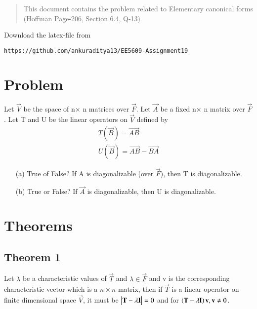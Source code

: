 \documentclass[journal,12pt,twocolumn]{IEEEtran}
\begin{document}
\begin{abstract}
This document contains the problem related to Elementary canonical forms (Hoffman Page-206, Section 6.4, Q-13) 
\end{abstract}
Download the latex-file from 
\begin{lstlisting}
https://github.com/ankuraditya13/EE5609-Assignment19
\end{lstlisting}

\section{Problem}
Let $\vec{V}$ be the space of n$\times$ n matrices over $\vec{F}$. Let $\vec{A}$ be a fixed n$\times$ n matrix over $\vec{F}$. Let T and U be the linear operators on $\vec{V}$ defined by 
\begin{align}
T(\vec{B}) = \vec{AB} \label{a}\\
U(\vec{B}) =\vec{AB} - \vec{BA}
\end{align}
\begin{enumerate}
\item[(a)] True of False? If A is diagonalizable (over $\vec{F}$), then T is diagonalizable. 
\item[(b)] True or False? If $\vec{A}$ is diagonalizable, then U is diagonalizable.
\end{enumerate}
\section{Theorems}
\subsection{Theorem 1}
Let $\lambda$ be a characteristic values of $\vec{T}$ and $\lambda \in \vec{F}$ and v is the corresponding characteristic vector which is a $n\times n$ matrix, then if $\vec{T}$ is a linear operator on finite dimensional space $\vec{V}$, it must be $\begin{vmatrix}\mathbf{T}-\lambda \mathbf{I}\end{vmatrix} = 0$ and for $\left(\mathbf{T}-\lambda \mathbf{I}\right)\mathbf{v}, \mathbf{v}\neq 0$.
\end{document}
